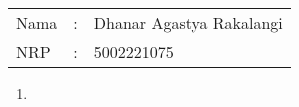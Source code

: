 \documentclass[a4paper, 12pt]{article}
\begin{document}
    \begin{tabular}{|lcl|}
     \hline
     Nama&:&Dhanar Agastya Rakalangi\\
     NRP&:&5002221075\\
     \hline
    \end{tabular}

    \begin{enumerate}
        \item 
    \end{enumerate}
    
\end{document}

